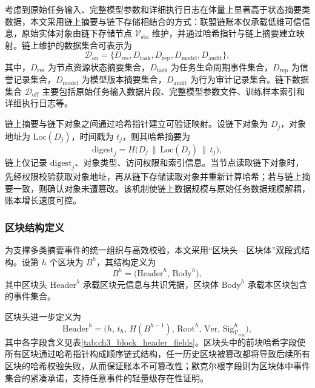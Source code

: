 考虑到原始任务输入、完整模型参数和详细执行日志在体量上显著高于状态摘要类数据，本文采用链上摘要与链下存储相结合的方式：联盟链账本仅承载低维可信信息，原始实体对象由链下存储节点 $\mathcal{V}_{\mathrm{sto}}$ 维护，并通过哈希指针与链上摘要建立映射。链上维护的数据集合可表示为
\begin{equation}
    \mathcal{D}_{\mathrm{on}}=\{D_{\mathrm{res}},D_{\mathrm{task}},D_{\mathrm{rep}},D_{\mathrm{model}},D_{\mathrm{audit}}\},
    \label{eq:ch3_onchain_data}
\end{equation}
其中，$D_{\mathrm{res}}$ 为节点资源状态摘要集合，$D_{\mathrm{task}}$ 为任务生命周期事件集合，$D_{\mathrm{rep}}$ 为信誉记录集合，$D_{\mathrm{model}}$ 为模型版本摘要集合，$D_{\mathrm{audit}}$ 为行为审计记录集合。链下数据集合 $\mathcal{D}_{\mathrm{off}}$ 主要包括原始任务输入数据片段、完整模型参数文件、训练样本索引和详细执行日志等。

链上摘要与链下对象之间通过哈希指针建立可验证映射。设链下对象为 $D_j$，对象地址为 $\mathrm{Loc}(D_j)$，时间戳为 $t_j$，则其哈希摘要为
\begin{equation}
    \mathrm{digest}_j=H\big(D_j\,\|\,\mathrm{Loc}(D_j)\,\|\,t_j\big),
    \label{eq:ch3_data_digest}
\end{equation}
链上仅记录 $\mathrm{digest}_j$、对象类型、访问权限和索引信息。当节点读取链下对象时，先经权限校验获取对象地址，再从链下存储读取对象并重新计算哈希；若与链上摘要一致，则确认对象未遭篡改。该机制使链上数据规模与原始任务数据规模解耦，账本增长速度可控。

\subsubsection{区块结构定义}

为支撑多类摘要事件的统一组织与高效校验，本文采用``区块头—区块体''双段式结构。设第 $h$ 个区块为 $B^h$，其结构定义为
\begin{equation}
    B^h=\big(\mathrm{Header}^h,\,\mathrm{Body}^h\big),
    \label{eq:ch3_block_def}
\end{equation}
其中区块头 $\mathrm{Header}^h$ 承载区块元信息与共识凭据，区块体 $\mathrm{Body}^h$ 承载本区块包含的事件集合。

区块头进一步定义为
\begin{equation}
    \mathrm{Header}^h=\big(h,\,t_h,\,H(B^{h-1}),\,\mathrm{Root}^h,\,\mathrm{Ver},\,\mathrm{Sig}_{\mathcal{V}_{\mathrm{con}}}^h\big),
    \label{eq:ch3_block_header}
\end{equation}
其中各字段含义见表\ref{tab:ch3_block_header_fields}。区块头中的前块哈希字段使所有区块通过哈希指针构成顺序链式结构，任一历史区块被篡改都将导致后续所有区块的哈希校验失败，从而保证账本不可篡改性；默克尔根字段则为区块体中事件集合的紧凑承诺，支持任意事件的轻量级存在性证明。

